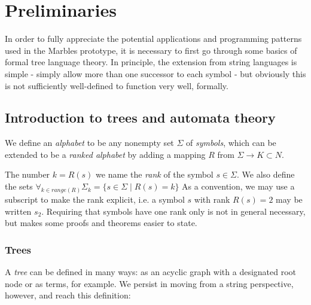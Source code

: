 \section{Preliminaries}

In order to fully appreciate the potential applications and programming
patterns used in the Marbles prototype, it is necessary to first go through
some basics of formal tree language theory. In principle, the extension
from string languages is simple - simply allow more than one successor to
each symbol - but obviously this is not sufficiently well-defined to
function very well, formally.

%

\subsection{Introduction to trees and automata theory}

We define an \emph{alphabet} to be any nonempty set $\Sigma$ of
\emph{symbols}, which can be extended to be a \emph{ranked alphabet}
by adding a mapping $R$ from $\Sigma \rightarrow K \subset N$.

The number $k = R(s)$ we name the \emph{rank} of the symbol $s \in \Sigma$.
We also define the sets $ \forall_{k \in \mathit{range}(R)} \Sigma_k = \{s \in \Sigma \mid R(s) = k\}$
As a convention, we may use a subscript to make the rank explicit, i.e. a
symbol $s$ with rank $R(s) = 2$ may be written $s_2$. Requiring that
symbols have one rank only is not in general necessary, but makes some
proofs and theorems easier to state.

\subsubsection{Trees}

A \emph{tree} can be defined in many ways: as an acyclic graph with a
designated root node or as terms, for example. We persist in moving from a
string perspective, however, and reach this definition:

